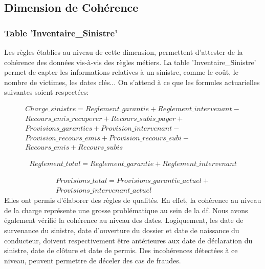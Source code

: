 

\subsection{Dimension de Coh\'erence }
\subsubsection{\textbf{Table 'Inventaire\_Sinistre'}}
Les r\`egles \'etablies au niveau de cette dimension, permettent d'attester de la coh\'erence des donn\'ees vis-\`a-vis des r\`egles m\'etiers. La table 'Inventaire\_Sinistre' permet de capter les informations relatives \`a un sinistre, comme le co\^ut, le nombre de victimes, les dates cl\'es... On s'attend \`a ce que les formules actuarielles suivantes soient respect\'ees:

\begin{equation}
  \begin{split}                                  
   Charge\_sinistre =  Reglement\_garantie + Reglement\_intervenant - \\
       Recours\_emis\_recuperer + Recours\_subis\_payer + \\
       Provisions\_garanties +  Provision\_intervenant - \\
        Provision\_recours\_emis + Provision\_recours\_subi -\\
        Recours\_emis + Recours\_subis
  \end{split}
\end{equation}

\begin{equation}
\begin{split}  
	Reglement\_total =  Reglement\_garantie + Reglement\_intervenant 
 \end{split}
\end{equation}

 
\begin{equation}
\begin{split}  
 Provisions\_total = Provisions\_garantie\_actuel + \\
 Provisions\_intervenant\_actuel  
\end{split}
\end{equation}
 Elles ont permis d'\'elaborer des r\`egles de qualit\'es. En effet, la coh\'erence au niveau de la charge repr\'esente une grosse probl\'ematique au sein de la \acrshort{df}. Nous avons \'egalement v\'erifi\'e la coh\'erence au niveau des dates. Logiquement, les date de survenance du sinistre, date d'ouverture du dossier et date de naissance du conducteur, doivent respectivement \^etre ant\'erieures aux date de d\'eclaration du sinistre, date de clôture et date de permis. Des incoh\'erences d\'etect\'ees \`a ce niveau, peuvent permettre de d\'eceler des cas de fraudes.\\

